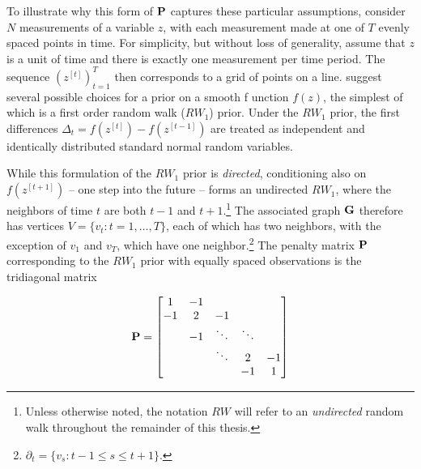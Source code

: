 To illustrate why this form of $\mathbf{P}$ captures these particular assumptions, 
consider $N$ measurements of a variable $z$, with each measurement made at 
one of $T$ evenly spaced points in time. For simplicity, but without loss of generality,  
assume that $z$ is a unit of time and there is exactly one measurement per time period.  
The sequence $(z^{[t]})_{t=1}^T$ then corresponds to a grid of points on a line. 
 suggest several possible choices for a prior on a smooth f
unction $f(z)$, the simplest of which is a first order random walk ($RW_1$) prior.  Under 
the $RW_1$ prior, the first differences $\Delta_t = f(z^{[t]}) - f(z^{[t-1]})$ are treated as 
independent and identically distributed standard normal random variables. 

While this formulation of the $RW_1$ prior is {\it directed}, conditioning also on 
$f(z^{[t+1]})$ -- one step into the future -- forms an undirected $RW_1$, where 
the neighbors of time $t$ are both $t-1$ and $t+1$.\footnote{Unless otherwise 
noted, the notation $RW$ will refer to an {\it undirected} random walk throughout 
the remainder of this thesis.} The associated graph $\mathbf{G}$ therefore has vertices 
$V=\{v_t : t=1,\dots,T\}$, each of which has two neighbors, with the exception of 
$v_1$ and $v_T$, which have one neighbor.\footnote{$\partial_t = \{v_{s} : t - 1 \leq s \leq t + 1\}.$}  
The penalty matrix $\mathbf{P}$ corresponding to the $RW_1$ prior with equally 
spaced observations is the tridiagonal matrix

\begin{equation*}
\mathbf{P} = 
\begin{bmatrix}
1  	& -1 	& 		& 	& \\
-1  	& 2 	& -1 		& 	& \\
  	& -1 & \ddots 	& \ddots	& \\
  	&  	& \ddots 	& 2 	& -1\\
  	&  	& 		& -1 	& 1\\
\end{bmatrix}
\end{equation*}

